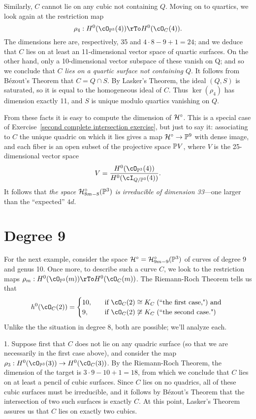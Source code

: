 Similarly, $C$ cannot lie on any cubic not containing $Q$. Moving on to quartics, we look again at the restriction map
$$
\rho_4 : H^0(\cO_{\PP^3}(4)) \rTo H^0(\cO_C(4)).
$$
The dimensions here are, respectively, 35 and $4\cdot 8 - 9 + 1 = 24$; and we deduce that $C$ lies on at least an 11-dimensional vector space of quartic surfaces. On the other hand, only a 10-dimensional vector subspace of these vanish on Q; and so we conclude that \emph{$C$ lies on a quartic surface not containing $Q$}. It follows from B\'ezout's Theorem that $C = Q \cap S$. By Lasker's Theorem, the ideal $(Q,S)$ is saturated, so it is equal to the homogeneous ideal of $C$. Thus $\ker(\rho_4)$ has dimension exactly 11, and  $S$ is unique modulo quartics vanishing on $Q$.

From these facts it is easy to compute the dimension of  $\cH^\circ$. This is a special case of Exercise~\ref{second complete intersection exercise}, but just to say it: associating to $C$ the unique quadric on which it lies gives a map $\cH^\circ \to \PP^9$ with dense image, and each fiber is an open subset of the projective space $\PP V$, where $V$ is the 25-dimensional vector space
$$
V = \frac{H^0(\cO_{\PP^3}(4))}{H^0(\cI_{Q/\PP^3}(4))}.
$$
It follows that \emph{the space $\cH^\circ_{8m-8}(\PP^3)$ is irreducible of dimension 33}---one larger than the ``expected'' $4d$.


\section{Degree 9}

For the next example, consider the space $\cH^\circ = \cH^\circ_{9m-9}(\PP^3)$ of curves of degree 9 and genus 10. Once more, to describe such a curve $C$, we look to the restriction maps $\rho_m: H^0(\cO_{\PP^3}(m)) \rTo H^0(\cO_C(m))$. The Riemann-Roch Theorem tells us that
\begin{align*}
h^0(\cO_C(2)) =
\begin{cases}
10, \quad &\text{if } \cO_C(2) \cong K_C \; \text{(``the first case,") and } \\
9,  \quad &\text{if } \cO_C(2) \not\cong K_C  \; \text{(``the second case.")}
\end{cases}
\end{align*}
Unlike the the situation in degree 8, both are possible; we'll analyze each.

1. Suppose first that $C$ does not lie on any quadric surface (so that we are necessarily in the first case above), and consider the map $\rho_3 : H^0(\cO_{\PP^3}(3)) \to H^0(\cO_C(3))$. By the Riemann-Roch Theorem, the dimension of the target is $3\cdot 9 - 10 + 1 = 18$, from which we conclude that $C$ lies on at least a pencil of cubic surfaces. Since $C$ lies on no quadrics, all of these cubic surfaces must be irreducible, and it follows by B\'ezout's Theorem that the intersection of two such surfaces is exactly $C$. At this point, Lasker's Theorem assures us that $C$ lies on exactly two cubics.

